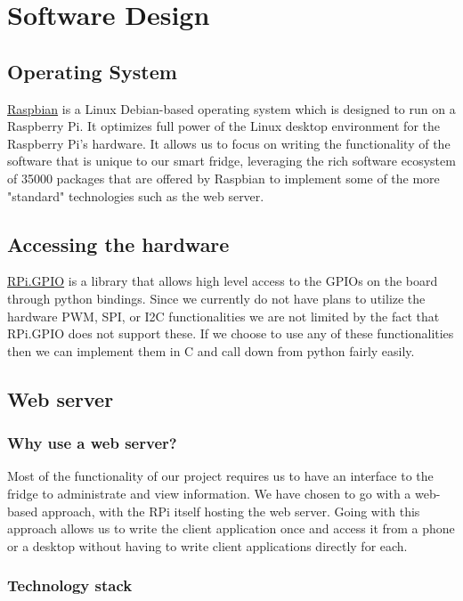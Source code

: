 \documentclass[10pt]{article}
\begin{document}
\newpage
\section{Software Design}
\subsection{Operating System}
\hyperref[https://www.raspbian.org/]{Raspbian} is a Linux Debian-based operating system which is designed to run on a Raspberry Pi. It optimizes full power of the Linux desktop environment for the Raspberry Pi's hardware. It allows us to focus on writing the functionality of the software that is unique to our smart fridge, leveraging the rich software ecosystem of 35000 packages that are offered by Raspbian to implement some of the more "standard" technologies such as the web server.

\subsection{Accessing the hardware}
\hyperref[https://pypi.python.org/pypi/RPi.GPIO]{RPi.GPIO} is a library that allows high level access to the GPIOs on the board through python bindings. Since we currently do not have plans to utilize the hardware PWM, SPI, or I2C functionalities we are not limited by the fact that RPi.GPIO does not support these. If we choose to use any of these functionalities then we can implement them in C and call down from python fairly easily.

\subsection{Web server}
\subsubsection{Why use a web server?}

Most of the functionality of our project requires us to have an interface to the fridge to administrate and view information. We have chosen to go with a web-based approach, with the RPi itself hosting the web server. Going with this approach allows us to write the client application once and access it from a phone or a desktop without having to write client applications directly for each.

\subsubsection{Technology stack}
\end{document}
